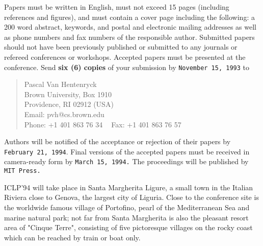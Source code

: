 {Papers must be written in English, must not exceed 15 pages (including
references and figures), and must contain a cover page including the
following: a 200 word abstract, keywords, and postal and electronic
mailing addresses as well as phone numbers and fax numbers of the
responsible author. Submitted papers should not have been previously
published or submitted to any journals or refereed conferences or
workshops. Accepted papers must be presented at the conference. 
Send {\bf six (6) copies} of your submission by {\tt November 15, 1993} to
\begin{quote}
Pascal Van Hentenryck \\
Brown University, Box 1910 \\
Providence, RI 02912 (USA) \\
Email: pvh@cs.brown.edu \\
Phone: +1 401 863 76 34 $\;\;$ Fax: +1 401 863 76 57 
\end{quote}
Authors will be notified of the acceptance or rejection of their
papers by {\tt February 21, 1994}. Final versions of the accepted
papers must be received in camera-ready form by {\tt March 15, 1994.}
The proceedings will be published by {\tt MIT Press.}

ICLP'94 will take place in Santa Margherita Ligure, a small town in
the Italian Riviera close to Genova, the largest city of Liguria.
Close to the conference site is the worldwide famous village of
Portofino, pearl of the Mediterranean Sea and marine natural park; not
far from Santa Margherita is also the pleasant resort area of "Cinque
Terre", consisting of five pictoresque villages on the rocky coast
which can be reached by train or boat only. 
}









